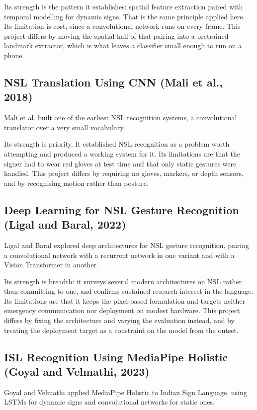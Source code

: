 Its strength is the pattern it establishes: spatial feature extraction paired with temporal modelling for dynamic signs. That is the same principle applied here. Its limitation is cost, since a convolutional network runs on every frame. This project differs by moving the spatial half of that pairing into a pretrained landmark extractor, which is what leaves a classifier small enough to run on a phone.

\subsection{NSL Translation Using CNN (Mali et al., 2018)}
Mali et al. \cite{mali2018nsl} built one of the earliest NSL recognition systems, a convolutional translator over a very small vocabulary.

Its strength is priority. It established NSL recognition as a problem worth attempting and produced a working system for it. Its limitations are that the signer had to wear red gloves at test time and that only static gestures were handled. This project differs by requiring no gloves, markers, or depth sensors, and by recognising motion rather than posture.

\subsection{Deep Learning for NSL Gesture Recognition (Ligal and Baral, 2022)}
Ligal and Baral \cite{ligal2022nsl} explored deep architectures for NSL gesture recognition, pairing a convolutional network with a recurrent network in one variant and with a Vision Transformer in another.

Its strength is breadth: it surveys several modern architectures on NSL rather than committing to one, and confirms sustained research interest in the language. Its limitations are that it keeps the pixel-based formulation and targets neither emergency communication nor deployment on modest hardware. This project differs by fixing the architecture and varying the evaluation instead, and by treating the deployment target as a constraint on the model from the outset.

\subsection{ISL Recognition Using MediaPipe Holistic (Goyal and Velmathi, 2023)}
Goyal and Velmathi \cite{goyal2023isl} applied MediaPipe Holistic to Indian Sign Language, using LSTMs for dynamic signs and convolutional networks for static ones.

